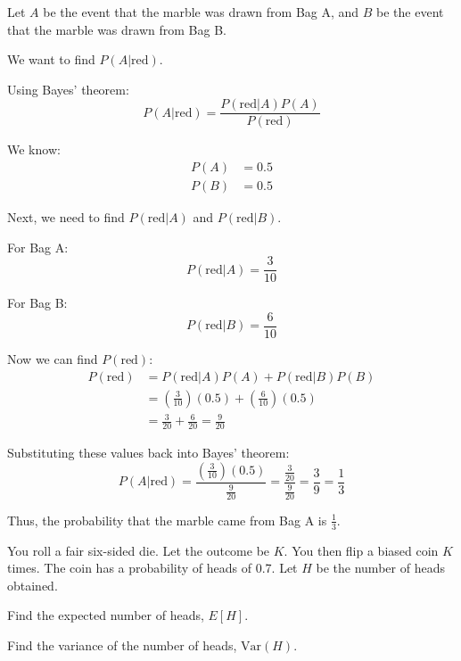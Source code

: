 \documentclass[a4paper, 10pt]{article}
\begin{document}
\begin{solution}
Let \( A \) be the event that the marble was drawn from Bag A,
and \( B \) be the event that the marble was drawn from Bag B.

\vspace{2mm}

We want to find \( P(A | \text{red}) \).

Using Bayes' theorem:
\[
P(A | \text{red}) = \frac{P(\text{red} | A) P(A)}{P(\text{red})}
\]

We know:
\begin{align*}
    P(A) &= 0.5 \\
    P(B) &= 0.5
\end{align*}

Next, we need to find \( P(\text{red} | A) \) and \( P(\text{red} | B) \).

For Bag A:
\[
P(\text{red} | A) = \frac{3}{10}
\]

For Bag B:
\[
P(\text{red} | B) = \frac{6}{10}
\]

Now we can find \( P(\text{red}) \):
\begin{align*}
    P(\text{red}) &= P(\text{red} | A) P(A) + P(\text{red} | B) P(B) \\
    &= \left(\frac{3}{10}\right)\left(0.5\right) + \left(\frac{6}{10}\right)\left(0.5\right) \\
    &= \frac{3}{20} + \frac{6}{20} = \frac{9}{20}
\end{align*}

Substituting these values back into Bayes' theorem:
\[
P(A | \text{red}) = \frac{\left(\frac{3}{10}\right)\left(0.5\right)}{\frac{9}{20}} = \frac{\frac{3}{20}}{\frac{9}{20}} = \frac{3}{9} = \frac{1}{3}
\]

Thus, the probability that the marble came from Bag A is \( \boxed{\frac{1}{3}} \).
\end{solution}


\begin{problem}
You roll a fair six-sided die. Let the outcome be \( K \).
You then flip a biased coin \( K \) times. The coin has a probability of heads of 0.7.
Let \( H \) be the number of heads obtained.
\begin{subproblems}
    \item Find the expected number of heads, \( E[H] \).
    \item Find the variance of the number of heads, \( \text{Var}(H) \).
\end{subproblems}
\end{problem}
\end{document}
